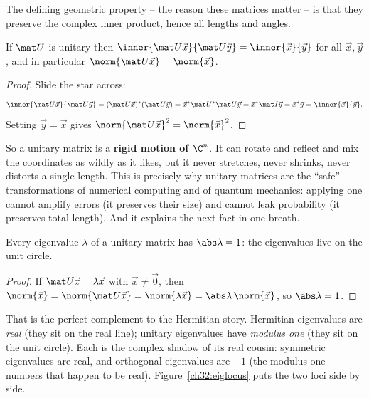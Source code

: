 The defining geometric property -- the reason these matrices matter -- is that they
preserve the complex inner product, hence all lengths and angles.

\begin{theorem}\label{ch32:unitarynorm}
If $\mat U$ is unitary then $\inner{\mat U\vec x}{\mat U\vec y} =
\inner{\vec x}{\vec y}$ for all $\vec x,\vec y$, and in particular
$\norm{\mat U\vec x} = \norm{\vec x}$.
\end{theorem}

\begin{proof}
Slide the star across:
\[
  \inner{\mat U\vec x}{\mat U\vec y} = (\mat U\vec x)^{*}(\mat U\vec y)
  = \vec x^{*}\mat U^{*}\mat U\vec y = \vec x^{*}\mat I\vec y
  = \vec x^{*}\vec y = \inner{\vec x}{\vec y}.
\]
Setting $\vec y=\vec x$ gives $\norm{\mat U\vec x}^2 = \norm{\vec x}^2$.
\end{proof}

So a unitary matrix is a \textbf{rigid motion of $\C^n$}. It can rotate and reflect
and mix the coordinates as wildly as it likes, but it never stretches, never
shrinks, never distorts a single length. This is precisely why unitary matrices
are the ``safe'' transformations of numerical computing and of quantum mechanics:
applying one cannot amplify errors (it preserves their size) and cannot leak
probability (it preserves total length). And it explains the next fact in one
breath.

\begin{corollary}\label{ch32:unitaryeig}
Every eigenvalue $\lambda$ of a unitary matrix has $\abs\lambda = 1$: the
eigenvalues live on the unit circle.
\end{corollary}

\begin{proof}
If $\mat U\vec x=\lambda\vec x$ with $\vec x\ne\vec 0$, then
$\norm{\vec x} = \norm{\mat U\vec x} = \norm{\lambda\vec x} =
\abs\lambda\,\norm{\vec x}$, so $\abs\lambda = 1$.
\end{proof}

That is the perfect complement to the Hermitian story. Hermitian eigenvalues are
\emph{real} (they sit on the real line); unitary eigenvalues have \emph{modulus
one} (they sit on the unit circle). Each is the complex shadow of its real cousin:
symmetric eigenvalues are real, and orthogonal eigenvalues are $\pm 1$ (the
modulus-one numbers that happen to be real). Figure~\ref{ch32:eiglocus} puts the
two loci side by side.

